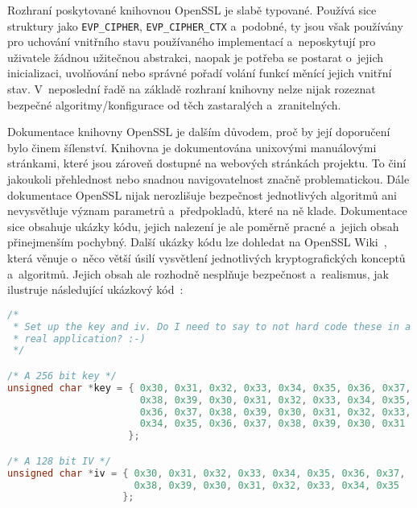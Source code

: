 Rozhraní poskytované knihovnou OpenSSL je slabě typované. Používá sice struktury jako \texttt{EVP\_CIPHER}, \texttt{EVP\_CIPHER\_CTX} a~podobné, ty jsou však používány pro uchování vnitřního stavu používaného implementací a~neposkytují pro uživatele žádnou užitečnou abstrakci, naopak je potřeba se postarat o~jejich inicializaci, uvolňování nebo správné pořadí volání funkcí měnící jejich vnitřní stav. V~neposlední řadě na základě rozhraní knihovny nelze nijak rozeznat bezpečné algoritmy/konfigurace od těch zastaralých a~zranitelných.

Dokumentace knihovny OpenSSL je dalším důvodem, proč by její doporučení bylo činem šílenství. Knihovna je dokumentována unixovými manuálovými stránkami, které jsou zároveň dostupné na webových stránkách projektu. To činí jakoukoli přehlednost nebo snadnou navigovatelnost značně problematickou. Dále dokumentace OpenSSL nijak nerozlišuje bezpečnost jednotlivých algoritmů ani nevysvětluje význam parametrů a~předpokladů, které na ně klade. Dokumentace sice obsahuje ukázky kódu, jejich nalezení je ale poměrně pracné a~jejich obsah přinejmenším pochybný. Další ukázky kódu lze dohledat na OpenSSL Wiki~\cite{openssl-wiki}, která věnuje o~něco větší úsilí vysvětlení jednotlivých kryptografických konceptů a~algoritmů. Jejich obsah ale rozhodně nesplňuje bezpečnost a~realismus, jak ilustruje následující ukázkový kód~\cite{openssl-wiki-example}:

\begin{lstlisting}[caption={~Ukázka použití knihovny OpenSSL z~OpenSSL Wiki},language=C]
/*
 * Set up the key and iv. Do I need to say to not hard code these in a
 * real application? :-)
 */

/* A 256 bit key */
unsigned char *key = { 0x30, 0x31, 0x32, 0x33, 0x34, 0x35, 0x36, 0x37,
                       0x38, 0x39, 0x30, 0x31, 0x32, 0x33, 0x34, 0x35,
                       0x36, 0x37, 0x38, 0x39, 0x30, 0x31, 0x32, 0x33,
                       0x34, 0x35, 0x36, 0x37, 0x38, 0x39, 0x30, 0x31
                     };

/* A 128 bit IV */
unsigned char *iv = { 0x30, 0x31, 0x32, 0x33, 0x34, 0x35, 0x36, 0x37,
                      0x38, 0x39, 0x30, 0x31, 0x32, 0x33, 0x34, 0x35
                    };
\end{lstlisting}

